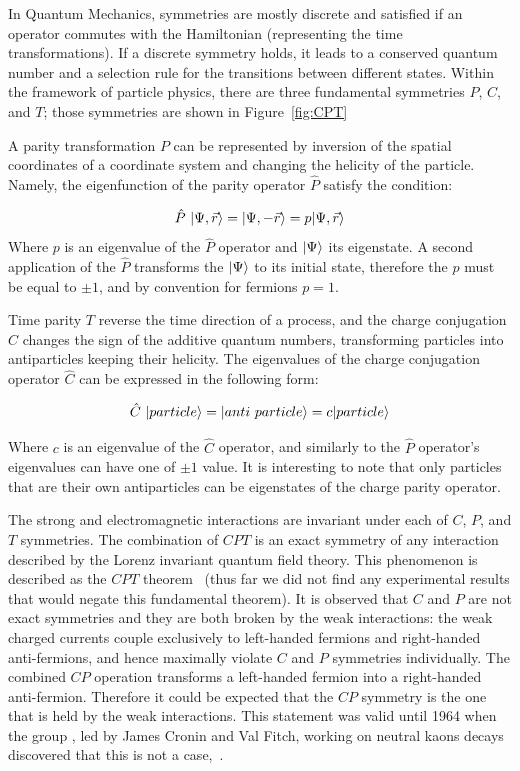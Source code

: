 In Quantum Mechanics, symmetries are mostly discrete and satisfied if an operator commutes with the Hamiltonian (representing the time transformations). If a discrete symmetry holds, it leads to a conserved quantum number and a selection rule for the transitions between different states. 
Within the framework of particle physics, there are three fundamental symmetries $P$, $C$, and $T$; those symmetries are shown in Figure~\ref{fig:CPT}

A parity transformation $P$ can be represented by inversion of the spatial coordinates of a coordinate system and changing the helicity of the particle. Namely, the eigenfunction of the parity operator $  \hat{P}$ satisfy the condition: 

\begin{equation}
    \hat{P}~ \lvert\Psi, \vec{r}\rangle = \lvert\Psi, - \vec{r}\rangle = p \lvert\Psi, \vec{r}\rangle  
\end{equation}
Where $p$ is an eigenvalue of the $ \hat{P}$ operator and $\lvert\Psi\rangle$ its eigenstate. A second application of the $\hat{P}$ transforms the $\lvert\Psi\rangle$ to its initial state, therefore the $p$ must be equal to $\pm 1$, and by convention for fermions $p=1$.  


Time parity $T$ reverse the time direction of a process, and the charge conjugation $C$ changes the sign of the additive quantum numbers, transforming particles into antiparticles keeping their helicity. The eigenvalues of the  charge conjugation operator $\hat{C}$ can be expressed in the following form:
 

\begin{equation}
    \hat{C}~ \lvert particle\rangle = \lvert anti~ particle\rangle = c \lvert particle\rangle  
\end{equation}

Where $c$ is an eigenvalue of the $ \hat{C}$ operator, and similarly to the $\hat{P}$ operator's eigenvalues can have one of $\pm 1$ value. It is interesting to note that only particles that
are their own antiparticles can be eigenstates of the charge parity operator.

The strong and electromagnetic interactions are invariant under each of $C$, $P$, and $T$ symmetries.  The combination of $CPT$ is an exact symmetry of any interaction described by the Lorenz invariant quantum field theory. This phenomenon is described as the $CPT$ theorem~\cite{CPT_theorm} (thus far we did not find any experimental results that would negate this fundamental theorem).
It is observed that $C$ and $P$ are not exact symmetries and they are both broken by the weak interactions: the weak charged currents couple exclusively to left-handed fermions and right-handed anti-fermions, and hence maximally violate $C$ and $P$ symmetries individually. The combined $CP$ operation transforms a left-handed fermion into a right-handed anti-fermion. Therefore it could be expected that the $CP$ symmetry is the one that is held by the weak interactions. This statement was valid until 1964 when the group , led by James Cronin and Val Fitch, working on neutral kaons decays discovered that this is not a case,~\cite{CPV_kaons}. 

